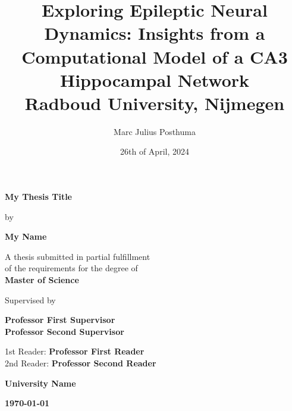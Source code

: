 \title{
{Exploring Epileptic Neural Dynamics: Insights from a Computational Model of a CA3 Hippocampal Network}\\
{\large Radboud University, Nijmegen}\\
}
\author{Marc Julius Posthuma}
\date{26th of April, 2024}

\begin{titlepage}
    \centering
    \vspace*{1cm}

    \Huge\textbf{My Thesis Title}\\
    \vspace{1.5cm}

    \Large by\\
    \vspace{0.5cm}

    \Large\textbf{My Name}\\
    \vspace{2cm}

    \Large A thesis submitted in partial fulfillment\\
    of the requirements for the degree of\\
    \vspace{0.5cm}
    \textbf{Master of Science}\\
    \vspace{2cm}

    \Large Supervised by\\
    \vspace{0.5cm}

    \textbf{Professor First Supervisor}\\
    \textbf{Professor Second Supervisor}\\
    \vspace{1cm}

    \Large 1st Reader: \textbf{Professor First Reader}\\
    2nd Reader: \textbf{Professor Second Reader}\\
    \vspace{2cm}

    \Large\textbf{University Name}\\
    \vspace{2cm}

    \Large\textbf{\today}\\
\end{titlepage}